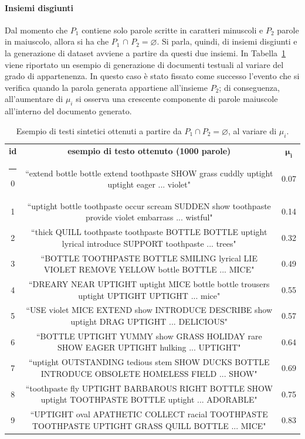 \documentclass[12pt]{report}
\makeatletter
\theoremstyle{definition}
\newcommand{\thickhline}{%
    \noalign {\ifnum 0=`}\fi \hrule height 1pt
    \futurelet \reserved@a \@xhline
}
\let\emptyset\varnothing
\makeatother
\begin{document}
\paragraph{Insiemi disgiunti}
Dal momento che $P_1$ contiene solo parole scritte in caratteri minuscoli e $P_2$ parole in maiuscolo, allora si ha che $P_1$ $\cap$ $P_2 = \emptyset$. Si parla, quindi, di insiemi disgiunti e la generazione di dataset avviene a partire da questi due insiemi. In Tabella~\ref{generationexample} viene riportato un esempio di generazione di documenti testuali al variare del grado di appartenenza. In questo caso è stato fissato come successo l'evento che si verifica quando la parola generata appartiene all'insieme $P_2$; di conseguenza, all'aumentare di $\mu_i$ si osserva una crescente componente di parole maiuscole all'interno del documento generato.
\begin{table}
\centering
\begin{adjustbox}{max width=\textwidth}
 \begin{tabular}{|c|c|c|} 
 \hline
\textbf{id} & \textbf{esempio di testo ottenuto (1000 parole)} & $\bm{\mu_i}$  
\\ [0.5ex] 
 \thickhline
0 & ``extend bottle bottle extend toothpaste SHOW grass cuddly uptight uptight eager ... violet" & 0.07 \\ 
1 & ``uptight bottle toothpaste occur scream SUDDEN show toothpaste provide violet embarrass ... wistful" & 0.14 \\
2 & ``thick QUILL toothpaste toothpaste BOTTLE BOTTLE uptight lyrical introduce SUPPORT toothpaste ... trees" & 0.32 \\
3 & ``BOTTLE TOOTHPASTE BOTTLE SMILING lyrical LIE VIOLET REMOVE YELLOW bottle BOTTLE ... MICE" & 0.49 \\
4 & ``DREARY NEAR UPTIGHT uptight MICE bottle bottle trousers uptight UPTIGHT UPTIGHT ... mice" & 0.55\\
5 & ``USE violet MICE EXTEND show INTRODUCE DESCRIBE show uptight DRAG UPTIGHT ... DELICIOUS" & 0.57\\
6 & ``BOTTLE UPTIGHT YUMMY show GRASS HOLIDAY rare SHOW EAGER UPTIGHT hulking ... UPTIGHT" & 0.64\\
7 & ``uptight OUTSTANDING tedious stem SHOW DUCKS BOTTLE INTRODUCE OBSOLETE HOMELESS FIELD ... SHOW" & 0.69 \\
8 & ``toothpaste fly UPTIGHT BARBAROUS RIGHT BOTTLE SHOW uptight TOOTHPASTE BOTTLE uptight ... ADORABLE" & 0.75\\
9 & ``UPTIGHT oval APATHETIC COLLECT racial TOOTHPASTE TOOTHPASTE UPTIGHT GRASS QUILL BOTTLE ... MICE" & 0.83\\
 \hline
\end{tabular}
\end{adjustbox}
\caption{Esempio di testi sintetici ottenuti a partire da $P_1 \cap P_2 = \emptyset$, al variare di $\mu_i$.}
\label{generationexample}
\end{table}
\end{document}

